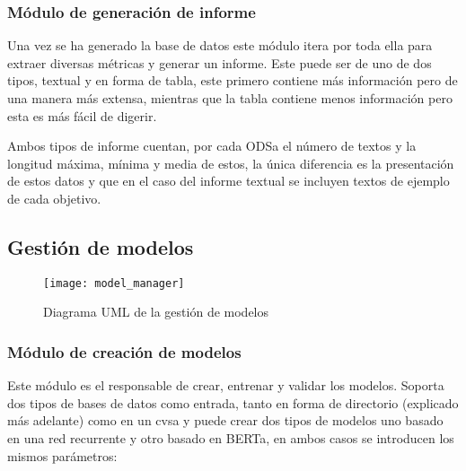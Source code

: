 \subsubsection{Módulo de generación de informe} Una vez se ha generado la base de
datos este módulo itera por toda ella para extraer diversas métricas y generar
un informe. Este puede ser de uno de dos tipos, textual y en forma de tabla,
este primero contiene más información pero de una manera más extensa, mientras
que la tabla contiene menos información pero esta es más fácil de digerir.

Ambos tipos de informe cuentan, por cada \gls{ODSa} el número de textos y la
longitud máxima, mínima y media de estos, la única diferencia es la
presentación de estos datos y que en el caso del informe textual se incluyen
textos de ejemplo de cada objetivo. 

\subsection{Gestión de modelos}

\begin{figure}[H]
    \hspace*{-1.7cm}
    \centering
    \texttt{[image: model\_manager]}
    \captionsetup{justification=centering}
    \caption{Diagrama UML de la gestión de modelos}
    \label{fig: Diagrama UML de la gestion de modelos}
\end{figure}

\subsubsection{Módulo de creación de modelos} Este módulo es el responsable de
crear, entrenar y validar los modelos. Soporta dos tipos de bases de datos como
entrada, tanto en forma de directorio (explicado más adelante) como en un
\gls{cvsa} y puede crear dos tipos de modelos uno basado en una red
recurrente y otro basado en \gls{BERTa}, en ambos casos se introducen los mismos
parámetros:
 
